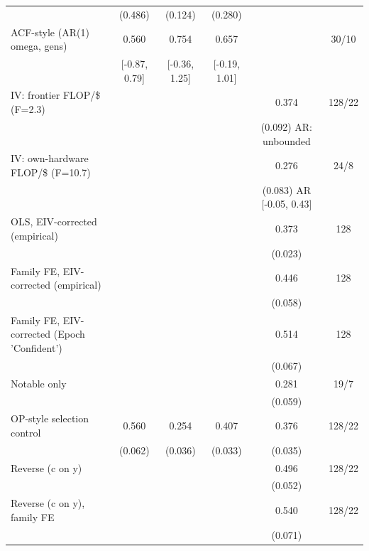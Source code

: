 \begin{table}[!htbp]
\begin{threeparttable}
\begin{tabular}{lccccc}
 & (0.486) & (0.124) & (0.280) &  &  \\
ACF-style (AR(1) omega, gens) & 0.560 & 0.754 & 0.657 &  & 30/10 \\
 & [-0.87, 0.79] & [-0.36, 1.25] & [-0.19, 1.01] &  &  \\
IV: frontier FLOP/\$ (F=2.3) &  &  &  & 0.374 & 128/22 \\
 &  &  &  & (0.092) AR: unbounded &  \\
IV: own-hardware FLOP/\$ (F=10.7) &  &  &  & 0.276 & 24/8 \\
 &  &  &  & (0.083) AR [-0.05, 0.43] &  \\
OLS, EIV-corrected (empirical) &  &  &  & 0.373 & 128 \\
 &  &  &  & (0.023) &  \\
Family FE, EIV-corrected (empirical) &  &  &  & 0.446 & 128 \\
 &  &  &  & (0.058) &  \\
Family FE, EIV-corrected (Epoch 'Confident') &  &  &  & 0.514 & 128 \\
 &  &  &  & (0.067) &  \\
Notable only &  &  &  & 0.281 & 19/7 \\
 &  &  &  & (0.059) &  \\
OP-style selection control & 0.560 & 0.254 & 0.407 & 0.376 & 128/22 \\
 & (0.062) & (0.036) & (0.033) & (0.035) &  \\
Reverse (c on y) &  &  &  & 0.496 & 128/22 \\
 &  &  &  & (0.052) &  \\
Reverse (c on y), family FE &  &  &  & 0.540 & 128/22 \\
 &  &  &  & (0.071) &  \\
\bottomrule
\end{tabular}
\begin{tablenotes}[flushleft]
\footnotesize

\end{tablenotes}
\end{threeparttable}
\end{table}
